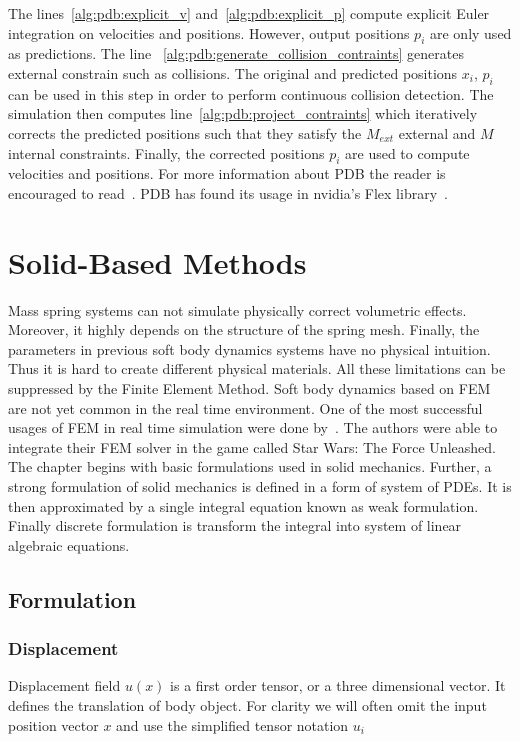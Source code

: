 \documentclass[en]{minipw} %
\begin{document}
The lines~\ref{alg:pdb:explicit_v} and~\ref{alg:pdb:explicit_p} compute explicit Euler integration on velocities and positions. However, output positions $p_i$ are only used as predictions. 
The line ~\ref{alg:pdb:generate_collision_contraints} generates external constrain such as collisions. The original and predicted positions $x_i$, $p_i$ can be used in this step in order to perform continuous collision detection.
The simulation then computes line~\ref{alg:pdb:project_contraints} which iteratively corrects the predicted positions such that they satisfy the $M_{ext}$ external and $M$ internal constraints.
Finally, the corrected positions $p_i$ are used to compute velocities and positions. For more information about PDB the reader is encouraged to read~\cite{physics_notes}.
PDB has found its usage in nvidia's Flex library~\cite{flex}.

\chapter{Solid-Based Methods}
\label{chap:solid_mechanics1}

Mass spring systems can not simulate physically correct volumetric effects. Moreover, it highly depends on the structure of the spring mesh. Finally, the parameters in previous soft body dynamics systems have no physical intuition. Thus it is hard to create different physical materials. All these limitations can be suppressed by the Finite Element Method. Soft body dynamics based on FEM are not yet common in the real time environment. One of the most successful usages of FEM in real time simulation were done by~\cite{parker}. The authors were able to integrate their FEM solver in the game called Star Wars: The Force Unleashed. The chapter begins with basic formulations used in solid mechanics. Further, a strong formulation of solid mechanics is defined in a form of system of PDEs. It is then approximated by a single integral equation known as weak formulation. Finally discrete formulation is transform the integral into system of linear algebraic equations. 

\section{Formulation}
\subsection{Displacement}
Displacement field $u(x)$ is a first order tensor, or a three dimensional vector. It defines the translation of body object. For clarity we will often omit the input position vector $x$ and use the simplified tensor notation $u_i$
\end{document}
